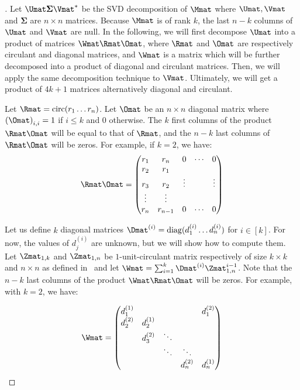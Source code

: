 \begin{proof}[]
Let $\Umat \mathbf{\Sigma} \Vmat^*$ be the SVD decomposition of $\Mmat$ where $\Umat,\Vmat$ and $\mathbf{\Sigma}$ are $n \times n$ matrices.
Because $\Mmat$ is of rank $k$, the last $n-k$ columns of $\Umat$ and $\Vmat$ are null.
In the following, we will first decompose $\Umat$ into a product of matrices $\Wmat\Rmat\Omat$, where $\Rmat$ and $\Omat$ are respectively circulant and diagonal matrices, and $\Wmat$ is a matrix which will be further decomposed into a product of diagonal and circulant matrices.
Then, we will apply the same decomposition technique to $\Vmat$.
Ultimately, we will get a product of $4k+1$ matrices alternatively diagonal and circulant.

Let $\Rmat = \circulant(r_1\ldots r_n)$. Let $\Omat$ be an $n \times n$ diagonal matrix where $\leftmat \Omat \rightmat_{i,i} = 1$ if $i \le k$ and $0$ otherwise.
The $k$ first columns of the product $\Rmat\Omat$ will be equal to that of $\Rmat$, and the $n-k$ last columns of $\Rmat\Omat$ will be zeros. For example, if $k=2$, we have: 
\begin{equation}
  \Rmat\Omat = \leftmatrix
  r_{1} & r_{n} & 0 & \cdots & 0\\
  r_{2} & r_{1}\\
  r_{3} & r_{2} & \vdots &  & \vdots\\
  \vdots & \vdots\\
  r_{n} & r_{n-1} & 0 & \cdots & 0
  \rightmatrix
\end{equation}

\noindent
Let us define $k$ diagonal matrices $\Dmat^{(i)} = \diagonal(d_1^{(i)} \ldots d_n^{(i)})$ for $i \in [k]$.
For now, the values of $d_{j}^{(i)}$ are unknown, but we will show how to compute them.
Let $\Zmat_{1, k}$ and $\Zmat_{1, n}$ be $1$-unit-circulant matrix respectively of size $k \times k$ and $n \times n$ as defined in~ and let $\Wmat = \sum_{i=1}^{k} \Dmat^{(i)} \Zmat_{1,n}^{i-1}$.
Note that the $n-k$ last columns of the product $\Wmat\Rmat\Omat$ will be zeros.
For example, with $k=2$, we have: 

\begin{equation}
  \Wmat = \leftmatrix
  d_{1}^{(1)} &  &  &  & d_{1}^{(2)} \\
  d_{2}^{(2)} & d_{2}^{(1)} \\
   & d_{3}^{(2)} & \ddots \\
   &  & \ddots & \ddots \\
   &  &  & d_{n}^{(2)} & d_{n}^{(1)}
  \rightmatrix
\end{equation}


\end{proof}

